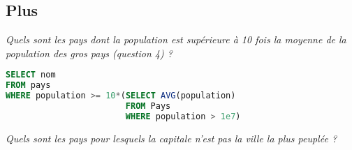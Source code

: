 \subsection{Plus} 
\begin{Exercise}
\it Quels sont les pays dont la population est supérieure à 10 fois la moyenne de la population des gros pays (question 4) ?
\end{Exercise}
\begin{Answer}
\begin{lstlisting}[language=SQL]
SELECT nom
FROM pays
WHERE population >= 10*(SELECT AVG(population)
                        FROM Pays
                        WHERE population > 1e7)
\end{lstlisting}
\end{Answer}
\begin{Exercise}
\it Quels sont les pays pour lesquels la capitale n'est pas la ville la plus peuplée ?
\end{Exercise}
